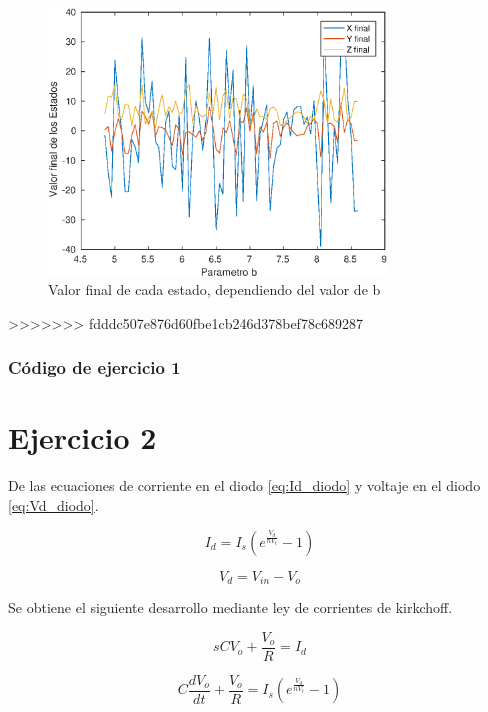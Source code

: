 \documentclass[12pt,letterpaper]{article}
\begin{document}
\begin{figure}
	\centering
	\includegraphics[width=0.8\textwidth]{pictures/sensibilidad}
	\caption{Valor final de cada estado, dependiendo del valor de b}
	\label{fig:sensibilidad}
\end{figure}
>>>>>>> fdddc507e876d60fbe1cb246d378bef78c689287

\subsubsection{Código de ejercicio 1}



\section{Ejercicio 2}

De las ecuaciones de corriente en el diodo \eqref{eq:Id_diodo} y voltaje en el diodo  \eqref{eq:Vd_diodo}.

\begin{equation}
\label{eq:Id_diodo}
I_d=I_s(e^{\frac{V_d}{nV_t}}-1)
\end{equation}



\begin{equation}\label{eq:Vd_diodo}
V_d= V_{in}-V_o
\end{equation}

Se obtiene el siguiente desarrollo mediante ley de corrientes de kirkchoff. 

\begin{equation}
sCV_o + \frac{V_o}{R} = I_d
\end{equation}

\begin{equation}
C \frac{dV_o}{dt} + \frac{V_o}{R} = I_s\left(e^{\frac{V_d}{nV_t}}-1\right)
\end{equation}
\end{document}
